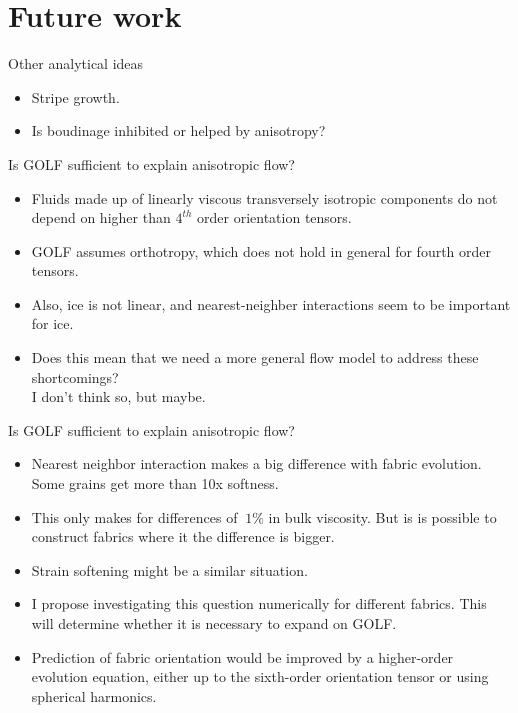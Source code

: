 \documentclass{beamer}
\begin{document}
\section{Future work}

\begin{frame}{Other analytical ideas}
   \begin{itemize}
      \item Stripe growth.
      \item Is boudinage inhibited or helped by anisotropy?
      
   \end{itemize}
\end{frame}


\begin{frame}{Is GOLF sufficient to explain anisotropic flow?}
   \begin{itemize}
      \item Fluids made up of linearly viscous transversely isotropic components do not depend on higher than $4^{th}$ order orientation tensors.
      \item GOLF assumes orthotropy, which does not hold in general for fourth order tensors.
      \item Also, ice is not linear, and nearest-neighber interactions seem to be important for ice.
      \item Does this mean that we need a more general flow model to address these shortcomings? \\
         \pause I don't think so, but maybe.
   \end{itemize}
\end{frame}
\begin{frame}{Is GOLF sufficient to explain anisotropic flow?}
   \begin{itemize}
      \item Nearest neighbor interaction makes a big difference with fabric evolution. Some grains get more than 10x softness.
      \item This only makes for differences of $~1\%$ in bulk viscosity. But is is possible to construct fabrics where it the difference is bigger.
      \item Strain softening might be a similar situation.
      \item I propose investigating this question numerically for different fabrics. This will determine whether it is necessary to expand on GOLF.
      \item Prediction of fabric orientation would be improved by a higher-order evolution equation, either up to the sixth-order orientation tensor or using spherical harmonics.
   \end{itemize}
\end{frame}
\end{document}
